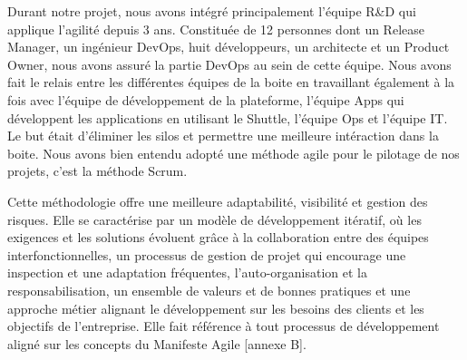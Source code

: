 \begin{spacing}{1.2}
Durant notre projet, nous avons intégré principalement l'équipe R\&D qui applique l'agilité depuis 3 ans.
Constituée de 12 personnes dont un Release Manager, un ingénieur DevOps, huit développeurs, un architecte et un Product Owner, nous avons assuré la partie DevOps au sein de cette équipe. Nous avons fait le relais entre les différentes équipes de la boite en travaillant également à la fois avec l'équipe de développement de la plateforme, l'équipe Apps qui développent les applications en utilisant le Shuttle, l'équipe Ops et l'équipe IT. Le but était d'éliminer les silos et permettre une meilleure intéraction dans la boite. Nous avons bien entendu adopté une méthode agile pour le pilotage de nos projets, c'est la méthode Scrum.

Cette méthodologie offre une meilleure adaptabilité, visibilité et gestion des risques. Elle se caractérise par un modèle de développement itératif, où les exigences et les solutions évoluent grâce à la collaboration entre des équipes interfonctionnelles, un processus de gestion de projet qui encourage une inspection et une adaptation fréquentes, l'auto-organisation et la responsabilisation, un ensemble de valeurs et de bonnes pratiques et une approche métier alignant le développement sur les besoins des clients et les objectifs de l'entreprise. Elle fait référence à tout processus de développement aligné sur les concepts du Manifeste Agile [annexe B]\cite{manifesto}.

\end{spacing}
